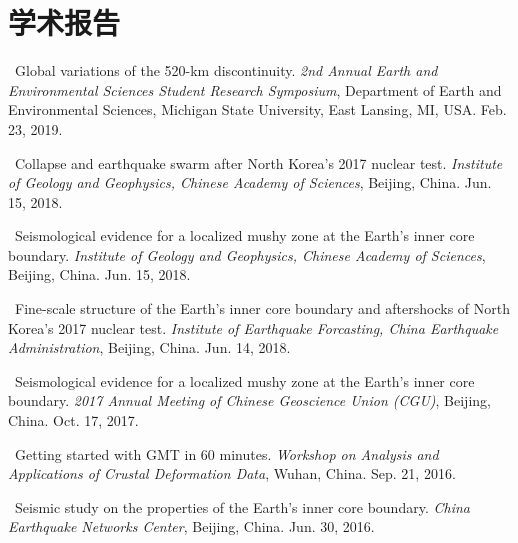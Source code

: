 \section*{学术报告}
\begin{etaremune}
\item
    \Tian\
    Global variations of the 520-km discontinuity.
    \textit{ 2nd Annual Earth and Environmental Sciences Student Research Symposium},
    Department of Earth and Environmental Sciences, Michigan State University, East Lansing, MI, USA.
    Feb. 23, 2019.
\item
    \Tian\
    Collapse and earthquake swarm after North Korea's 2017 nuclear test.
    \textit{Institute of Geology and Geophysics, Chinese Academy of Sciences}, Beijing, China.
    Jun. 15, 2018.
\item
    \Tian\
    Seismological evidence for a localized mushy zone at the Earth's inner core boundary.
    \textit{Institute of Geology and Geophysics, Chinese Academy of Sciences}, Beijing, China.
    Jun. 15, 2018.
    \invited
\item
    \Tian\
    Fine-scale structure of the Earth's inner core boundary and aftershocks of North Korea's 2017 nuclear test.
    \textit{Institute of Earthquake Forcasting, China Earthquake Administration}, Beijing, China.
    Jun. 14, 2018.
\item
    \Tian\
    Seismological evidence for a localized mushy zone at the Earth's inner core boundary.
    \textit{2017 Annual Meeting of Chinese Geoscience Union (CGU)}, Beijing, China.
    Oct. 17, 2017.
    \invited
\item
    \Tian\
    Getting started with GMT in 60 minutes.
    \textit{Workshop on Analysis and Applications of Crustal Deformation Data}, Wuhan, China.
    Sep. 21, 2016.
    \invited
\item
    \Tian\
    Seismic study on the properties of the Earth's inner core boundary.
    \textit{China Earthquake Networks Center}, Beijing, China.
    Jun. 30, 2016.
    \invited
\end{etaremune}
